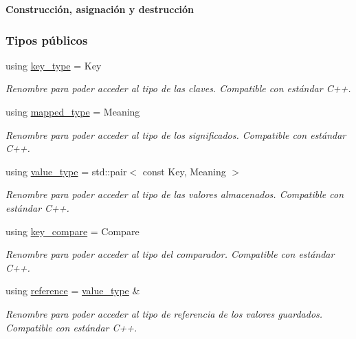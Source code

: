 \begin{Indent}{\bf \-Construcción, asignación y destrucción}
\subsubsection*{Tipos públicos}
\begin{DoxyCompactItemize}
\item 
using \hyperlink{classaed2_1_1iterator_afd2dbf717b48e5921b9d7f5c97bdf16e_afd2dbf717b48e5921b9d7f5c97bdf16e}{key\+\_\+type} = Key
\begin{DoxyCompactList}\small\item\em Renombre para poder acceder al tipo de las claves. Compatible con estándar C++. \end{DoxyCompactList}\item 
using \hyperlink{classaed2_1_1iterator_a9616435dd0f809fcd47b1c23264c217e_a9616435dd0f809fcd47b1c23264c217e}{mapped\+\_\+type} = Meaning
\begin{DoxyCompactList}\small\item\em Renombre para poder acceder al tipo de los significados. Compatible con estándar C++. \end{DoxyCompactList}\item 
using \hyperlink{classaed2_1_1iterator_a6411a2c08b2b7c52f063bef1a168acb6_a6411a2c08b2b7c52f063bef1a168acb6}{value\+\_\+type} = std\+::pair$<$ const Key, Meaning $>$
\begin{DoxyCompactList}\small\item\em Renombre para poder acceder al tipo de las valores almacenados. Compatible con estándar C++. \end{DoxyCompactList}\item 
using \hyperlink{classaed2_1_1iterator_a958d31cebad5df42b144eb6da2d44764_a958d31cebad5df42b144eb6da2d44764}{key\+\_\+compare} = Compare
\begin{DoxyCompactList}\small\item\em Renombre para poder acceder al tipo del comparador. Compatible con estándar C++. \end{DoxyCompactList}\item 
using \hyperlink{classaed2_1_1iterator_ad4ba975de35932c0cc8af3c25a6748bf_ad4ba975de35932c0cc8af3c25a6748bf}{reference} = \hyperlink{classaed2_1_1iterator_a6411a2c08b2b7c52f063bef1a168acb6_a6411a2c08b2b7c52f063bef1a168acb6}{value\+\_\+type} \&
\begin{DoxyCompactList}\small\item\em Renombre para poder acceder al tipo de referencia de los valores guardados. Compatible con estándar C++. \end{DoxyCompactList}\item 

\end{DoxyCompactItemize}
\end{Indent}
